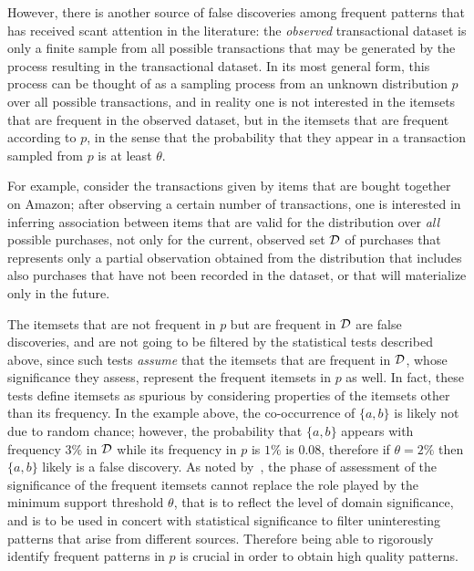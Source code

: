 However, there is another source of false discoveries among frequent patterns
that has received scant attention in the literature: the \emph{observed}
transactional dataset is only a finite sample from all possible transactions that may be generated by the 
process resulting in the transactional dataset.
In its most general form, this process can be thought of as a sampling process
from an unknown distribution $p$ over all possible transactions, and in reality
one is not interested in the itemsets that are frequent in the observed dataset,
but in the itemsets that are frequent according to $p$, in the sense that the
probability that they appear in a transaction sampled from $p$ is at least
$\theta$.

For example, consider
the transactions given by items that are bought together on Amazon; after
observing a certain number of transactions, one is interested in inferring
association between items that are valid for the distribution over \emph{all} possible
purchases, not only for the current, observed set ${\cal D}$ of purchases that
represents only a partial observation obtained from the distribution that
includes also purchases that have not been recorded in the dataset, or that will
materialize only in the future.

The itemsets
that are not frequent in $p$ but are frequent in ${\cal D}$ are false discoveries, and are not going to be filtered by
the statistical tests described above, since such tests \emph{assume} that the
itemsets that are frequent in ${\cal D}$, whose significance they assess, represent the frequent itemsets
in $p$ as well. In fact, these tests define itemsets as spurious by considering
properties of the itemsets other than its frequency. In the example above, the
co-occurrence of $\{a,b\}$ is likely not due to random chance; however, the
probability that $\{a,b\}$ appears with frequency $3\%$  in ${\cal D}$ while its
frequency in $p$ is $1\%$ is $0.08$, therefore if $\theta=2\%$ then $\{a,b\}$ likely is a false
discovery. As noted by~\citet{LiuZW11}, the phase of assessment of the
significance of the frequent itemsets cannot replace the role played by the minimum support
threshold $\theta$, that is to reflect the level of domain significance, and is to be used
in concert with statistical significance to filter uninteresting patterns that
arise from different sources. Therefore being able to rigorously identify frequent patterns in $p$ 
is crucial in order to obtain high quality patterns.


